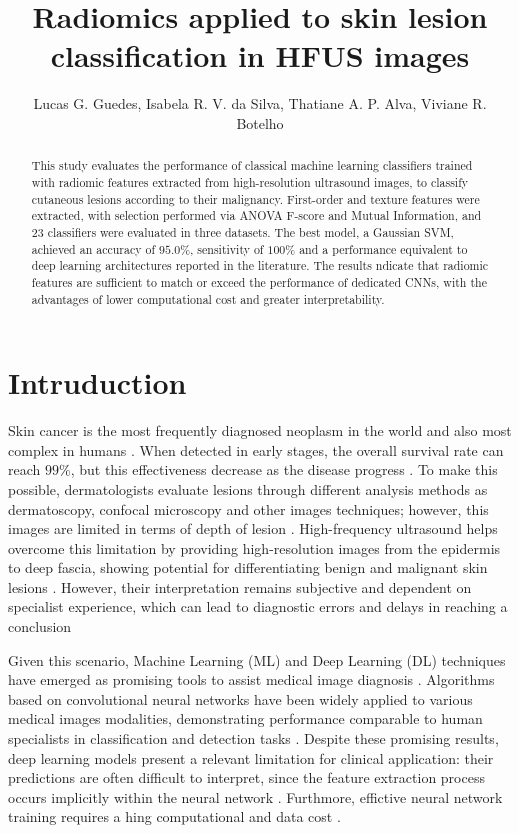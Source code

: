 \documentclass[12pt]{article}
\title{Radiomics applied to skin lesion classification in HFUS images}
\author{Lucas G. Guedes\inst{1}, Isabela R. V. da Silva\inst{2}, Thatiane A. P. Alva\inst{3}, Viviane R. Botelho\inst{4}}
\begin{document}
 

\maketitle

\begin{abstract}
This study evaluates the performance of classical machine learning classifiers trained with radiomic features extracted from high-resolution ultrasound images, to classify cutaneous lesions according to their malignancy. First-order and texture features were extracted, with selection performed via ANOVA F-score and Mutual Information, and 23 classifiers were evaluated in three datasets. The best model, a Gaussian SVM, achieved an accuracy of $95.0\%$, sensitivity of $100\%$ and a performance equivalent to deep learning architectures reported in the literature. The results ndicate that radiomic features are sufficient to match or exceed the performance of dedicated CNNs, with the advantages of lower computational cost and greater interpretability. 
\end{abstract}


\section{Intruduction}

Skin cancer is the most frequently diagnosed neoplasm in the world and also most complex in humans \cite{Juan2023, Zhu2024}. When detected in early stages, the overall survival rate can reach $99\%$, but this effectiveness decrease as the disease progress \cite{Goyal2020}. To make this possible, dermatologists evaluate lesions through different analysis methods as dermatoscopy, confocal microscopy and other images techniques; however, this images are limited in terms of depth of lesion \cite{Xiao2025, Zhu2024}. High-frequency ultrasound helps overcome this limitation by providing high-resolution images from the epidermis to deep fascia, showing potential for differentiating benign and malignant skin lesions \cite{daSilva2026, Czajkowska2021-1}. However, their interpretation remains subjective and dependent on specialist experience, which can lead to diagnostic errors and delays in
reaching a conclusion \cite{Qin2025}

Given this scenario, Machine Learning (ML) and Deep Learning (DL) techniques have emerged as promising tools to assist medical image diagnosis \cite{daSilva2026}. Algorithms based on convolutional neural networks have been widely applied to various medical images modalities, demonstrating performance comparable to human specialists in classification and detection tasks \cite{LaverdeSaad2021}. Despite these promising results, deep learning models present a relevant limitation for clinical application: their predictions are often difficult to interpret, since the feature extraction process occurs implicitly within the neural network \cite{Qin2025}. Furthmore, effictive neural network training requires a hing computational and data cost \cite{LaverdeSaad2021}. 
\end{document}
